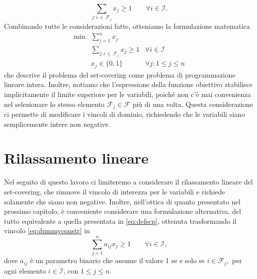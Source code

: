\begin{equation}\label{eq:dummyconstr}
    \sum_{j\colon i \,\in\, \mathcal{F}_j} \!\!x_j \geq 1 \qquad \forall i \in \mathcal{I}.
\end{equation}
Combinando tutte le considerazioni fatte, otteniamo la formulazione matematica
\begin{equation}\label{eq:defscp}
    \begin{array}{lll}
        \min & \displaystyle\sum_{j = 1}^n x_j \\[20pt]
             & \!\!\!\displaystyle\sum_{j\colon i \,\in\, \mathcal{F}_j} \!\!x_j \geq 1 & \forall i \in \mathcal{I} \\[20pt]
             & x_j \in \{0, 1\} & \forall j\colon 1 \leq j \leq n
    \end{array}
\end{equation}
che descrive il problema del set-covering come problema di programmazione lineare intera. Inoltre, notiamo che
l'espressione della funzione obiettivo stabilisce implicitamente il limite superiore per le variabili, poiché non c'è
mai convenienza nel selezionare lo stesso elemento \( \mathcal{F}_j \in \mathcal{F}\) più di una volta. Questa
considerazione ci permette di modificare i vincoli di dominio, richiedendo che le variabili siano semplicemente intere
non negative.

\section{Rilassamento lineare}

Nel seguito di questo lavoro ci limiteremo a considerare il rilassamento lineare del set-covering, che rimuove il
vincolo di interezza per le variabili e richiede solamente che siano non negative. Inoltre, nell'ottica di quanto
presentato nel prossimo capitolo, è conveniente considerare una formulazione alternativa, del tutto equivalente a quella
presentata in \eqref{eq:defscp}, ottenuta trasformando il vincolo \eqref{eq:dummyconstr} in
\begin{equation}
    \sum_{j=1}^n a_{ij}x_j \geq 1 \qquad \forall i \in \mathcal{I},
\end{equation}
dove \( a_{ij} \) è un parametro binario che assume il valore 1 se e solo se
\(
    i \in \mathcal{F}_j,
\)
per ogni elemento
\(
    i \in \mathcal{I} \text{, con } 1\leq j \leq n.
\)

